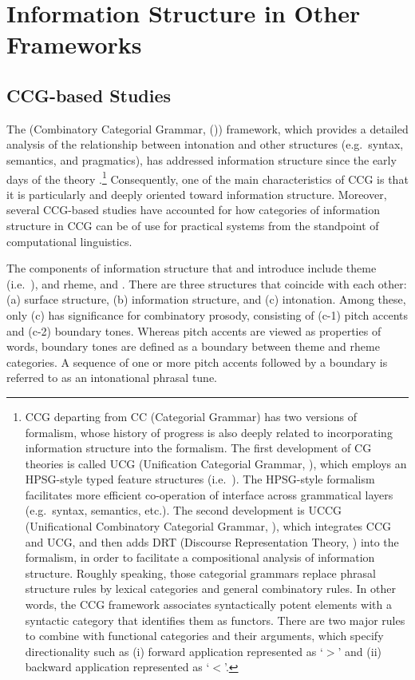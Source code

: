 \section{Information Structure in Other Frameworks}
\label{8:sec:other-frameworks}


\subsection{CCG-based Studies}
\label{8:ssec:ccg}

The  (Combinatory Categorial Grammar,
(\citealt{steedman:01})) framework, which provides a detailed analysis
of the relationship between intonation and other structures
(e.g.\ syntax, semantics, and pragmatics), has addressed information
structure since the early days of the theory
\citep{steedman:00}.\footnote{CCG departing from CC (Categorial
  Grammar) has two versions of formalism, whose history of progress is
  also deeply related to incorporating information structure into the
  formalism. The first development of CG theories is called UCG
  (Unification Categorial Grammar, \cite{zeevat:87}), which employs an
  HPSG-style typed feature structures (i.e.\ ). The
  HPSG-style formalism facilitates more efficient co-operation of
  interface across grammatical layers (e.g.\ syntax, semantics,
  etc.). The second development is UCCG (Unificational Combinatory
  Categorial Grammar, \citep{traat:bos:04}), which integrates CCG and
  UCG, and then adds DRT (Discourse Representation Theory,
  \citep{kamp:reyle:93}) into the formalism, in order to facilitate a
  compositional analysis of information structure.  Roughly speaking,
  those categorial grammars replace phrasal structure rules by lexical
  categories and general combinatory rules. In other words, the CCG
  framework associates syntactically potent elements with a syntactic
  category that identifies them as functors. There are two major rules
  to combine with functional categories and their arguments, which
  specify directionality such as (i) forward application represented
  as `\ensuremath{>}' and (ii) backward application represented as
  `\ensuremath{<}'.} Consequently, one of the main characteristics of
CCG is that it is particularly and deeply oriented toward information
structure. Moreover, several CCG-based studies have accounted for how
categories of information structure in CCG can be of use for practical
systems from the standpoint of computational linguistics.


The components of information structure that \citet{steedman:00} and
\citet{traat:bos:04} introduce include theme (i.e.\ ), and rheme,
and . There are three structures that coincide with each other:
(a) surface structure, (b) information structure, and (c) intonation.
Among these, only (c) has significance for combinatory prosody,
consisting of (c-1) pitch accents and (c-2) boundary tones. Whereas
pitch accents are viewed as properties of words, boundary tones are
defined as a boundary between theme and rheme categories.  A sequence
of one or more pitch accents followed by a boundary is referred to as
an intonational phrasal tune.



